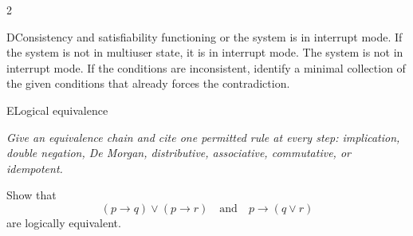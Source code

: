 \documentclass[9pt]{extarticle}
\begin{document}
\begin{multicols}{2}
\begin{CoreProblem}{D}{Consistency and satisfiability}
functioning or the system is in interrupt mode. If the system is not in
multiuser state, it is in interrupt mode. The system is not in interrupt mode.
If the conditions are inconsistent, identify a minimal collection of the given
conditions that already forces the contradiction.
\end{CoreProblem}
\begin{CoreProblem}{E}{Logical equivalence}
{\scriptsize\textit{Give an equivalence chain and cite one permitted rule at every step: implication, double negation, De Morgan, distributive, associative, commutative, or idempotent.}\par}
Show that
\[
  (p\to q)\lor(p\to r)
  \quad\text{and}\quad
  p\to(q\lor r)
\]
are logically equivalent.
\end{CoreProblem}
\end{multicols}
\CoreWorkArea
\FormBreak
{}
\end{document}
